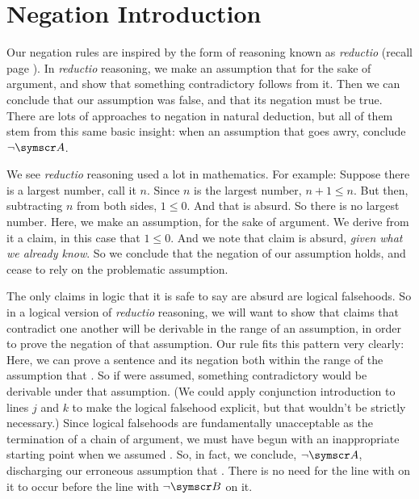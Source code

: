 \section{Negation Introduction}\label{negint}

Our negation rules are inspired by the form of reasoning known as \emph{reductio} (recall page \pageref{reductio}). In \emph{reductio} reasoning, we make an assumption that  for the sake of argument, and show that something contradictory follows from it. Then we can conclude that our assumption was false, and that its negation must be true. There are lots of approaches to negation in natural deduction, but all of them stem from this same basic insight: when an assumption that  goes awry, conclude $\enot \meta{A}$.

We see \emph{reductio} reasoning used a lot in mathematics. For example: Suppose there is a largest number, call it $n$. Since $n$ is the largest number, $n+1 \leqslant n$. But then, subtracting $n$ from both sides, $1 \leqslant 0$. And that is absurd. So there is no largest number. Here, we make an assumption, for the sake of argument. We derive from it a claim, in this case that $1 \leqslant 0$. And we note that claim is absurd, \emph{given what we already know}. So we conclude that the negation of our assumption holds, and cease to rely on the problematic assumption.

The only claims in logic that it is safe to say are absurd are logical falsehoods. So in a logical version of \emph{reductio} reasoning, we will want to show that claims that contradict one another will be derivable in the range of an assumption, in order to prove the negation of that assumption. Our  rule fits this pattern very clearly:  Here, we can prove a sentence and its negation both within the range of the assumption that . So if  were assumed, something contradictory would be derivable under that assumption. (We could apply conjunction introduction to lines $j$ and $k$ to make the logical falsehood explicit, but that wouldn't be strictly necessary.) Since logical falsehoods are fundamentally unacceptable as the termination of a chain of argument, we must have begun with an inappropriate starting point when we assumed . So, in fact, we conclude, $\enot \meta{A}$, discharging our erroneous assumption that . There is no need for the line with  on it to occur before the line with $\enot\meta{B}$ on it.

